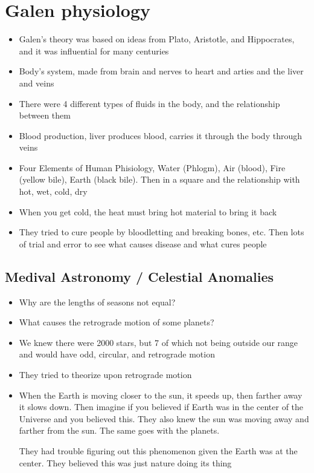 \documentclass{article}
\begin{document}
\section*{Galen physiology}
\begin{itemize}
  \item Galen's theory was based on ideas from Plato, Aristotle, and
    Hippocrates, and it was influential for many centuries
  \item Body's system, made from brain and nerves to heart and arties and the liver and veins
  \item There were 4 different types of fluids in the body,
    and the relationship between them
  \item Blood production, liver produces blood, carries it through the body
    through veins
  \item Four Elements of Human Phisiology, Water (Phlogm), Air (blood), Fire (yellow bile), Earth (black bile).
    Then in a square and the relationship with hot, wet, cold, dry
  \item When you get cold, the heat must bring hot material to bring it back
  \item They tried to cure people by bloodletting and breaking bones, etc.
    Then lots of trial and error to see what causes disease and what cures people
\end{itemize}

\subsection{Medival Astronomy / Celestial Anomalies}
\begin{itemize}
  \item Why are the lengths of seasons not equal?
  \item What causes the retrograde motion of some planets?
  \item We knew there were 2000 stars, but 7 of which not being outside
    our range and would have odd, circular, and retrograde motion
  \item They tried to theorize upon retrograde motion
  \item When the Earth is moving closer to the sun, it speeds up,
    then farther away it slows down.
    Then imagine if you believed if Earth was in the center of the Universe
    and you believed this. They also knew the sun was moving away and farther from the sun.
    The same goes with the planets.

    They had trouble figuring out this phenomenon given the Earth was at the center.
    They believed this was just nature doing its thing

\end{itemize}
\end{document}
